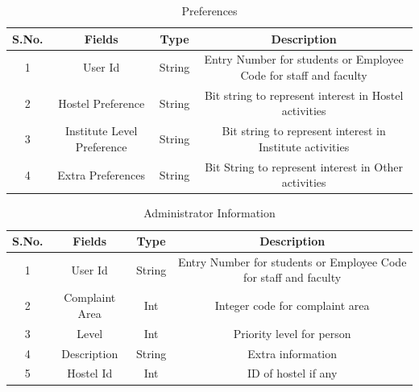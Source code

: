 \documentclass{article}
\begin{document}
\begin{table}[]
\centering
\caption{Preferences}
\label{my-label}
\begin{tabular}{|c|c|c|c|}
\hline
\textbf{S.No.} & \textbf{Fields}            & \textbf{Type} & \textbf{Description}                                             \\ \hline
1              & User Id                    & String        & Entry Number for students or Employee Code for staff and faculty \\ \hline
2              & Hostel Preference          & String        & Bit string to represent interest in Hostel activities            \\ \hline
3              & Institute Level Preference & String        & Bit string to represent interest in Institute activities         \\ \hline
4              & Extra Preferences          & String        & Bit String to represent interest in Other activities             \\ \hline
\end{tabular}
\end{table}



\begin{table}[]
\centering
\caption{Administrator Information}
\label{my-label}
\begin{tabular}{|c|c|c|c|}
\hline
\textbf{S.No.} & \textbf{Fields} & \textbf{Type} & \textbf{Description}                                             \\ \hline
1              & User Id         & String        & Entry Number for students or Employee Code for staff and faculty \\ \hline
2              & Complaint Area  & Int           & Integer code for complaint area                                  \\ \hline
3              & Level           & Int           & Priority level for person                                        \\ \hline
4              & Description     & String        & Extra information                                                \\ \hline
5 				& Hostel Id  & Int & ID of hostel if any \\ \hline
\end{tabular}
\end{table}
\end{document}
